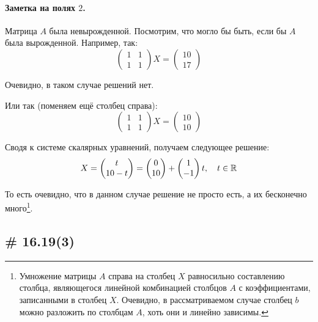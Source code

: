\documentclass[a4paper,12pt]{article}
\begin{document}
  \paragraph{Заметка на полях $2$.}
  
  Матрица $A$ была невырожденной.
  Посмотрим, что могло бы быть, если бы $A$ была вырожденной.
  Например, так:
  \[
    \begin{pmatrix}
      1 & 1\\
      1 & 1
    \end{pmatrix} X = \begin{pmatrix}
      10\\
      17
    \end{pmatrix}
  \]
  
  Очевидно, в таком случае решений нет.
  
  Или так (поменяем ещё столбец справа):
  \[
    \begin{pmatrix}
      1 & 1\\
      1 & 1
    \end{pmatrix} X = \begin{pmatrix}
      10\\
      10
    \end{pmatrix}
  \]
  
  Сводя к системе скалярных уравнений, получаем следующее решение:
  \[
    X = \begin{pmatrix}
      t\\
      10 - t
    \end{pmatrix}
    = \begin{pmatrix}
      0\\
      10
    \end{pmatrix} + \begin{pmatrix}
      1\\
      -1
    \end{pmatrix} t, \quad t \in \operatorname{\mathbb R}
  \]
  
  То есть очевидно, что в данном случае решение не просто есть, а их бесконечно много\footnote{Умножение матрицы $A$ справа на столбец $X$ равносильно составлению столбца, являющегося линейной комбинацией столбцов $A$ с коэффициентами, записанными в столбец $X$. Очевидно, в рассматриваемом случае столбец $b$ можно разложить по столбцам $A$, хоть они и линейно зависимы.}.
  
  
  
  \subsection{\# 16.19(3)}
  
\end{document}

